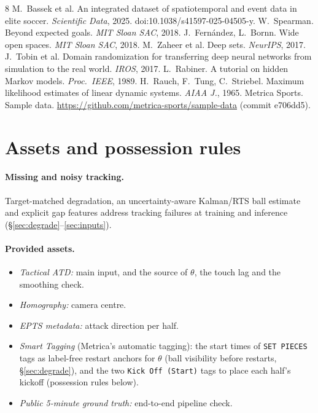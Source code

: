\documentclass[10pt,a4paper,twocolumn]{article}
\begin{document}
\begin{thebibliography}{8}\footnotesize\setlength{\itemsep}{0pt}
 M.~Bassek et al. An integrated dataset of spatiotemporal and event data in
  elite soccer. \emph{Scientific Data}, 2025. doi:10.1038/s41597-025-04505-y.
 W.~Spearman. Beyond expected goals. \emph{MIT Sloan SAC}, 2018.
 J.~Fern\'andez, L.~Bornn. Wide open spaces. \emph{MIT Sloan SAC}, 2018.
 M.~Zaheer et al. Deep sets. \emph{NeurIPS}, 2017.
 J.~Tobin et al. Domain randomization for transferring deep neural networks from
  simulation to the real world. \emph{IROS}, 2017.
 L.~Rabiner. A tutorial on hidden Markov models. \emph{Proc.\ IEEE}, 1989.
 H.~Rauch, F.~Tung, C.~Striebel. Maximum likelihood estimates of linear dynamic
  systems. \emph{AIAA J.}, 1965.
 Metrica Sports. Sample data.
  \url{https://github.com/metrica-sports/sample-data} (commit e706dd5).
\end{thebibliography}

\appendix
\section{Assets and possession rules}

\paragraph{Missing and noisy tracking.} Target-matched degradation, an uncertainty-aware
Kalman/RTS ball estimate and explicit gap features address tracking failures at training and
inference (\S\ref{sec:degrade}--\ref{sec:inputs}).

\paragraph{Provided assets.}
\begin{itemize}
  \item \emph{Tactical ATD:} main input, and the source of $\theta$, the touch lag and the
        smoothing check.
  \item \emph{Homography:} camera centre.
  \item \emph{EPTS metadata:} attack direction per half.
  \item \emph{Smart Tagging} (Metrica's automatic tagging): the start times of \texttt{SET PIECES}
        tags as label-free restart anchors for $\theta$ (ball visibility before restarts,
        \S\ref{sec:degrade}), and the two \texttt{Kick Off (Start)} tags to place each half's kickoff
        (possession rules below).
  \item \emph{Public 5-minute ground truth:} end-to-end pipeline check.
\end{itemize}
\end{document}
